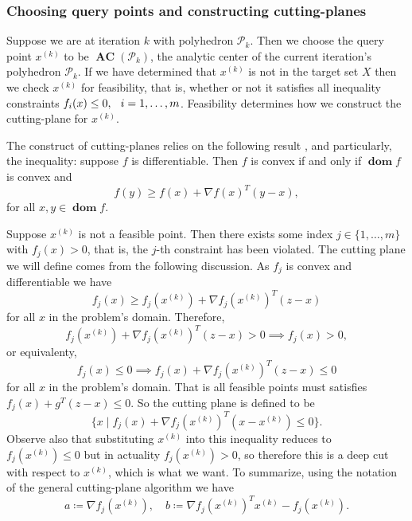 \documentclass[11pt]{amsart}
\theoremstyle{definition}
\theoremstyle{remark}
\newcommand{\gap}{\hspace*{0.25cm}}
\newcommand{\transpose}{T}
\DeclareMathOperator{\domain}{\textbf{dom}}
\DeclareMathOperator{\AC}{\textbf{AC}}
\begin{document}
        \subsubsection{Choosing query points and constructing cutting-planes} Suppose we are at iteration $k$ with polyhedron $\mathcal{P}_k$. Then we choose the query point $x^{(k)}$ to be $\AC(\mathcal{P}_k)$, the analytic center of the current iteration's polyhedron $\mathcal{P}_k$. If we have determined that $x^{(k)}$ is not in the target set $X$ then we check $x^{(k)}$ for feasibility, that is, whether or not it satisfies all inequality constraints $f_i(x) \leq 0, \gap i = 1, \dots, m$. Feasibility determines how we construct the cutting-plane for $x^{(k)}$.

        The construct of cutting-planes relies on the following result \cite[Section 3.1]{BV04}, and particularly, the inequality: suppose $f$ is differentiable. Then $f$ is convex if and only if $\domain f$ is convex and
        \begin{equation*}
            f(y) \geq f(x) + \nabla f(x)^\transpose (y - x),     
        \end{equation*} 
        for all $x, y \in \domain f$.

        Suppose $x^{(k)}$ is not a feasible point. Then there exists some index $j \in \{1, \dots, m\}$ with $f_j(x) > 0$, that is, the $j$-th constraint has been violated. The cutting plane we will define comes from the following discussion. As $f_j$ is convex and differentiable we have
        \begin{equation*}
            f_j(x) \geq f_j(x^{(k)}) + \nabla f_j(x^{(k)})^\transpose(z-x)
        \end{equation*}
        for all $x$ in the problem's domain. Therefore,
        \begin{equation*}
            f_j(x^{(k)}) + \nabla f_j(x^{(k)})^\transpose(z-x) > 0 \implies f_j(x) > 0,
        \end{equation*}
        or equivalenty,
        \begin{equation*}
            f_j(x) \leq 0 \implies f_j(x) + \nabla f_j(x^{(k)})^\transpose(z-x) \leq 0
        \end{equation*}
        for all $x$ in the problem's domain. That is all feasible points must satisfies $f_j(x) + g^\transpose(z-x) \leq 0$. So the cutting plane is defined to be
        \begin{equation*}
            \{x \;|\; f_j(x) + \nabla f_j(x^{(k)})^\transpose(x-x^{(k)}) \leq 0\}.
        \end{equation*}
        Observe also that substituting $x^{(k)}$ into this inequality reduces to $f_j(x^{(k)}) \leq 0$ but in actuality $f_j(x^{(k)}) > 0$, so therefore this is a deep cut with respect to $x^{(k)}$, which is what we want. To summarize, using the notation of the general cutting-plane algorithm we have
        \begin{equation}
            a \coloneqq \nabla f_j(x^{(k)}), \quad b \coloneqq \nabla f_j(x^{(k)})^\transpose x^{(k)} - f_j(x^{(k)}).
        \end{equation}
\end{document}
